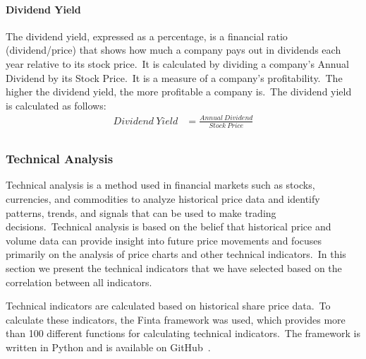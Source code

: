 \documentclass[../xlapes02]{subfiles}
\begin{document}
    \paragraph{Dividend Yield}\label{par:dividend-yield}
    The dividend yield, expressed as a percentage, is a financial ratio (dividend/price) that shows how much a company pays out in dividends each year relative to its stock price.\ It is calculated by dividing a company's Annual Dividend by its Stock Price.\ It is a measure of a company's profitability.\ The higher the dividend yield, the more profitable a company is.\ The dividend yield is calculated as follows:
    \begin{equation}
        \label{eq:dividend-yield}
        \begin{split}
            Dividend\ Yield&=\frac{Annual\ Dividend}{Stock\ Price}\\
        \end{split}
    \end{equation}

    \subsubsection{Technical Analysis}\label{subsubsec:technical-analysis}
    Technical analysis is a method used in financial markets such as stocks, currencies, and commodities to analyze historical price data and identify patterns, trends, and signals that can be used to make trading decisions.\ Technical analysis is based on the belief that historical price and volume data can provide insight into future price movements and focuses primarily on the analysis of price charts and other technical indicators.\ In this section we present the technical indicators that we have selected based on the correlation between all indicators.

    Technical indicators are calculated based on historical share price data.\ To calculate these indicators, the Finta framework was used, which provides more than 100 different functions for calculating technical indicators.\ The framework is written in Python and is available on GitHub~\cite{finta}.
\end{document}
